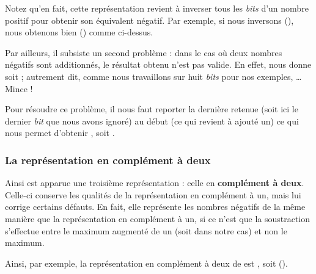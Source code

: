 \begin{infobox} 
 Notez qu'en fait, cette
représentation revient à inverser tous les \emph{bits} d'un nombre
positif pour obtenir son équivalent négatif. Par exemple, si nous
inversons  (), nous obtenons bien
 () comme ci-dessus.
\end{infobox}

Par ailleurs, il subsiste un second problème : dans le cas où deux
nombres négatifs sont additionnés, le résultat obtenu n'est pas valide.
En effet,  nous donne
 soit  ;
autrement dit, comme nous travaillons sur huit \emph{bits} pour nos
exemples, \ldots{} Mince !

Pour résoudre ce problème, il nous faut reporter la dernière retenue
(soit ici le dernier \emph{bit} que nous avons ignoré) au début (ce qui
revient à ajouté un) ce qui nous permet d'obtenir ,
soit .

\subsubsection{La représentation en complément à deux}
\label{la-representation-en-complement-a-deux}

Ainsi est apparue une troisième représentation : celle en
\textbf{complément à deux}. Celle-ci conserve les qualités de la
représentation en complément à un, mais lui corrige certains défauts. En
fait, elle représente les nombres négatifs de la même manière que la
représentation en complément à un, si ce n'est que la soustraction
s'effectue entre le maximum augmenté de un (soit  dans notre
cas) et non le maximum.

Ainsi, par exemple, la représentation en complément à deux de
 est , soit 
().

